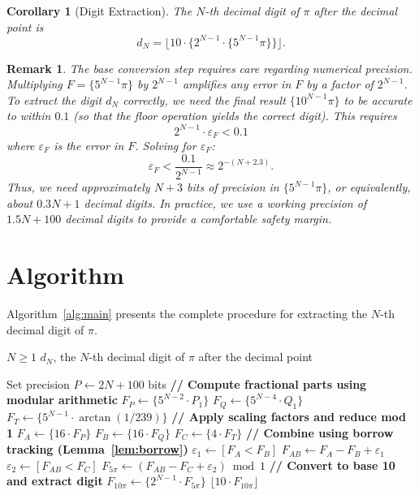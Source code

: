 \documentclass[11pt]{article}
\newtheorem{corollary}[theorem]{Corollary}
\newtheorem{remark}[theorem]{Remark}
\begin{document}
\begin{corollary}[Digit Extraction]\label{cor:digit}
The $N$-th decimal digit of $\pi$ after the decimal point is
\[
d_N = \lfloor 10 \cdot \{2^{N-1} \cdot \{5^{N-1}\pi\}\} \rfloor.
\]
\end{corollary}

\begin{remark}\label{rem:precision}
The base conversion step requires care regarding numerical precision. Multiplying $F = \{5^{N-1}\pi\}$ by $2^{N-1}$ amplifies any error in $F$ by a factor of $2^{N-1}$. To extract the digit $d_N$ correctly, we need the final result $\{10^{N-1}\pi\}$ to be accurate to within $0.1$ (so that the floor operation yields the correct digit). This requires
\[
2^{N-1} \cdot \varepsilon_F < 0.1
\]
where $\varepsilon_F$ is the error in $F$. Solving for $\varepsilon_F$:
\[
\varepsilon_F < \frac{0.1}{2^{N-1}} \approx 2^{-(N+2.3)}.
\]
Thus, we need approximately $N + 3$ bits of precision in $\{5^{N-1}\pi\}$, or equivalently, about $0.3N + 1$ decimal digits. In practice, we use a working precision of $1.5N + 100$ decimal digits to provide a comfortable safety margin.
\end{remark}

\section{Algorithm}

Algorithm~\ref{alg:main} presents the complete procedure for extracting the $N$-th decimal digit of $\pi$.

\begin{algorithm}[htb]
\caption{Decimal Digit Extraction for $\pi$}
\label{alg:main}
\begin{algorithmic}[1]
\Require $N \geq 1$
\Ensure $d_N$, the $N$-th decimal digit of $\pi$ after the decimal point

\State Set precision $P \gets 2N + 100$ bits
\Statex
\State \textbf{// Compute fractional parts using modular arithmetic}
\State $F_P \gets \{5^{N-2} \cdot P_1\}$ 
\State $F_Q \gets \{5^{N-4} \cdot Q_1\}$
\State $F_T \gets \{5^{N-1} \cdot \arctan(1/239)\}$ 
\Statex
\State \textbf{// Apply scaling factors and reduce mod 1}
\State $F_A \gets \{16 \cdot F_P\}$
\State $F_B \gets \{16 \cdot F_Q\}$
\State $F_C \gets \{4 \cdot F_T\}$
\Statex
\State \textbf{// Combine using borrow tracking (Lemma~\ref{lem:borrow})}
\State $\varepsilon_1 \gets [F_A < F_B]$ 
\State $F_{AB} \gets F_A - F_B + \varepsilon_1$
\State $\varepsilon_2 \gets [F_{AB} < F_C]$
\State $F_{5\pi} \gets (F_{AB} - F_C + \varepsilon_2) \bmod 1$
\Statex
\State \textbf{// Convert to base 10 and extract digit}
\State $F_{10\pi} \gets \{2^{N-1} \cdot F_{5\pi}\}$
\State \Return $\lfloor 10 \cdot F_{10\pi} \rfloor$
\end{algorithmic}
\end{algorithm}
\end{document}
